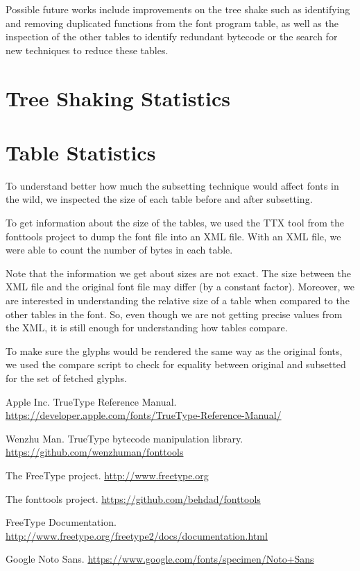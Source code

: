 \documentclass[12pt]{article}
\begin{document}
Possible future works include improvements on the tree shake such as
identifying and removing duplicated functions from the font program
table, as well as the inspection of the other tables to identify
redundant bytecode or the search for new techniques to reduce these
tables.

\clearpage
\begin{appendices}
\section{Tree Shaking Statistics}



\section{Table Statistics}

To understand better how much the subsetting technique would affect
fonts in the wild, we inspected the size of each table before and after
subsetting.

To get information about the size of the tables, we used the TTX tool
from the fonttools project to dump the font file into an XML file. With
an XML file, we were able to count the number of bytes in each table.

Note that the information we get about sizes are not exact. The size
between the XML file and the original font file may differ (by a constant factor). Moreover, we
are interested in understanding the relative size of a table when
compared to the other tables in the font. So, even though we are not
getting precise values from the XML, it is still enough for
understanding how tables compare.

To make sure the glyphs would be rendered the same way as the original
fonts, we used the compare script to check for equality between original
and subsetted for the set of fetched glyphs. 



\end{appendices}

\clearpage
\begin{thebibliography}{1}

 Apple Inc. TrueType Reference Manual. 
\url{https://developer.apple.com/fonts/TrueType-Reference-Manual/} 

 Wenzhu Man. TrueType bytecode manipulation library. 
\url{https://github.com/wenzhuman/fonttools} 

 The FreeType project. \url{http://www.freetype.org}

 The fonttools project. \url{https://github.com/behdad/fonttools} 

 FreeType Documentation.
\url{http://www.freetype.org/freetype2/docs/documentation.html}

 Google Noto Sans. 
\url{https://www.google.com/fonts/specimen/Noto+Sans} 

\end{thebibliography}
\end{document}
